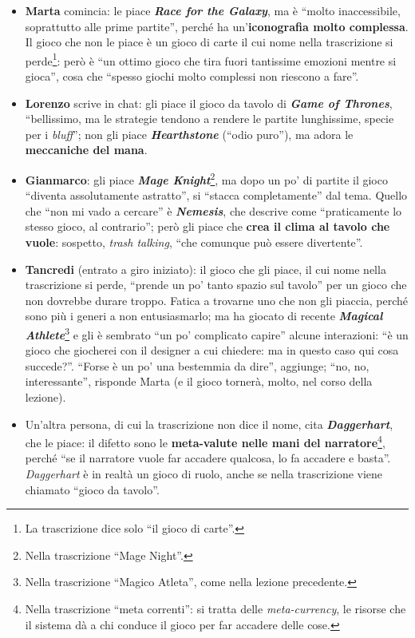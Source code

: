 \begin{itemize}
  \item \textbf{Marta} comincia: le piace \textbf{\emph{Race for the Galaxy}}, ma è
        ``molto inaccessibile, soprattutto alle prime partite'', perché ha
        un'\textbf{iconografia molto complessa}. Il gioco che non le piace è un
        gioco di carte il cui nome nella trascrizione si perde\footnote{La trascrizione
        dice solo ``il gioco di carte''.}: però è ``un ottimo gioco che tira fuori
        tantissime emozioni mentre si gioca'', cosa che ``spesso giochi molto complessi
        non riescono a fare''.
  \item \textbf{Lorenzo} scrive in chat: gli piace il gioco da tavolo di \textbf{\emph{Game
        of Thrones}}, ``bellissimo, ma le strategie tendono a rendere le partite
        lunghissime, specie per i \emph{bluff}''; non gli piace \textbf{\emph{Hearthstone}}
        (``odio puro''), ma adora le \textbf{meccaniche del mana}.
  \item \textbf{Gianmarco}: gli piace \textbf{\emph{Mage Knight}}\footnote{Nella
        trascrizione ``Mage Night''.}, ma dopo un po' di partite il gioco ``diventa
        assolutamente astratto'', si ``stacca completamente'' dal tema. Quello che ``non
        mi vado a cercare'' è \textbf{\emph{Nemesis}}, che descrive come ``praticamente lo
        stesso gioco, al contrario''; però gli piace che \textbf{crea il clima al tavolo
        che vuole}: sospetto, \emph{trash talking}, ``che comunque può essere
        divertente''.
  \item \textbf{Tancredi} (entrato a giro iniziato): il gioco che gli piace, il cui nome
        nella trascrizione si perde, ``prende un po' tanto spazio sul tavolo'' per un
        gioco che non dovrebbe durare troppo. Fatica a trovarne uno che non gli piaccia,
        perché sono più i generi a non entusiasmarlo; ma ha giocato di recente
        \textbf{\emph{Magical Athlete}}\footnote{Nella trascrizione ``Magico Atleta'',
        come nella lezione precedente.} e gli è sembrato ``un po' complicato capire''
        alcune interazioni: ``è un gioco che giocherei con il designer a cui chiedere: ma
        in questo caso qui cosa succede?''. ``Forse è un po' una bestemmia da dire'',
        aggiunge; ``no, no, interessante'', risponde Marta (e il gioco tornerà, molto,
        nel corso della lezione).
  \item Un'altra persona, di cui la trascrizione non dice il nome, cita
        \textbf{\emph{Daggerhart}}, che le piace: il difetto sono le
        \textbf{meta-valute nelle mani del narratore}\footnote{Nella trascrizione ``meta
        correnti'': si tratta delle \emph{meta-currency}, le risorse che il sistema dà a
        chi conduce il gioco per far accadere delle cose.}, perché ``se il narratore vuole
        far accadere qualcosa, lo fa accadere e basta''. \emph{Daggerhart} è in realtà un
        gioco di ruolo, anche se nella trascrizione viene chiamato ``gioco da tavolo''.
\end{itemize}

